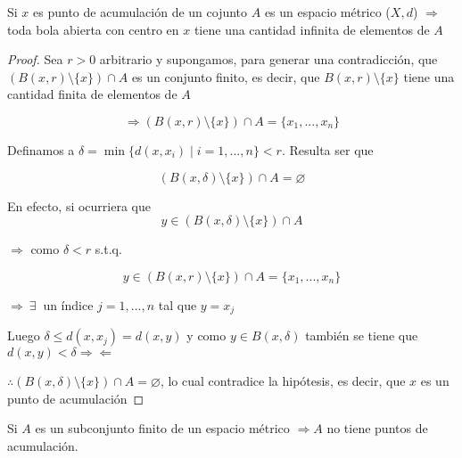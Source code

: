 \begin{theorem}
    Si $x$ es punto de acumulación de un cojunto $A$ es un espacio métrico ($X,d$) $\Rightarrow$ toda bola abierta con centro en $x$ tiene una cantidad infinita de elementos de $A$
\end{theorem}

\begin{proof}
    Sea $r > 0$ arbitrario y supongamos, para generar una contradicción, que $(B(x,r) \setminus \{ x \}) \cap A$ es un conjunto finito, es decir, que $B(x,r) \setminus \{ x \}$ tiene una cantidad finita de elementos de $A$

    \begin{equation*}
        \Rightarrow (B(x,r) \setminus \{ x \}) \cap A = \{ x_1, ..., x_n \}
    \end{equation*}

    Definamos a $\delta = \min \{ d(x, x_i) \mid i = 1 ,..., n \} < r$. Resulta ser que

    \begin{equation*}
         (B(x,\delta) \setminus \{ x \}) \cap A = \varnothing
    \end{equation*}

    En efecto, si ocurriera que
    \begin{equation*}
        y \in (B(x,\delta) \setminus \{ x \}) \cap A 
    \end{equation*}
    
    $\Rightarrow$ como $\delta < r$ s.t.q. 

    \begin{equation*}
        y \in  (B(x,r) \setminus \{ x \}) \cap A = \{ x_1, ..., x_n \}
    \end{equation*}

    $\Rightarrow \: \exists \:$ un índice $j=1,...,n$ tal que $y = x_j$

    Luego $\delta \leqslant d(x,x_j) = d(x,y)$ y como $y \in B(x, \delta)$ también se tiene que $d(x,y) < \delta \Rightarrow \Leftarrow$

    $\therefore   (B(x,\delta) \setminus \{ x \}) \cap A = \varnothing$, lo cual contradice la hipótesis, es decir, que $x$ es un punto de acumulación
\end{proof}

\begin{corollary}
    Si $A$ es un subconjunto finito de un espacio métrico $\Rightarrow A$ no tiene puntos de acumulación.
\end{corollary}

